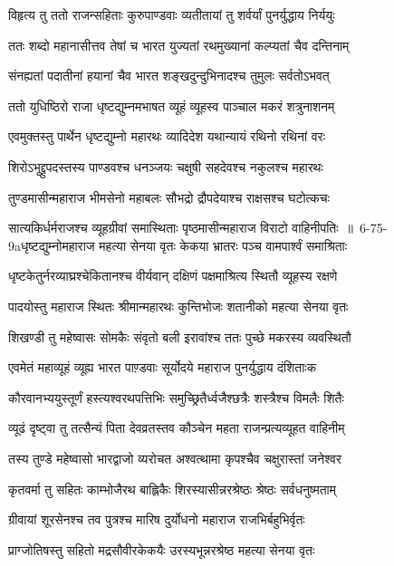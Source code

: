 \twolineshloka
{विहृत्य तु ततो राजन्सहिताः कुरुपाण्डवाः}
{व्यतीतायां तु शर्वर्यां पुनर्युद्धाय निर्ययुः}


\twolineshloka
{ततः शब्दो महानासीत्तव तेषां च भारत}
{युज्यतां रथमुख्यानां कल्प्यतां चैव दन्तिनाम्}


\twolineshloka
{संनह्यतां पदातीनां हयानां चैव भारत}
{शङ्खदुन्दुभिनादश्च तुमुलः सर्वतोऽभवत्}


\twolineshloka
{ततो युधिष्ठिरो राजा धृष्टद्युम्नमभाषत}
{व्यूहं व्यूहस्व पाञ्चाल मकरं शत्रुनाशनम्}


\twolineshloka
{एवमुक्तस्तु पार्थेन धृष्टद्युम्नो महारथः}
{व्यादिदेश यथान्यायं रथिनो रथिनां वरः}


\twolineshloka
{शिरोऽभूद्द्रुपदस्तस्य पाण्डवश्च धनञ्जयः}
{चक्षुषी सहदेवश्च नकुलश्च महारथः}


\twolineshloka
{तुण्डमासीन्महाराज भीमसेनो महाबलः}
{सौभद्रो द्रौपदेयाश्च राक्षसश्च घटोत्कचः}


\threelineshloka
{सात्यकिर्धर्मराजश्च व्यूहग्रीवां समास्थिताः}
{पृष्ठमासीन्महाराज विराटो वाहिनीपतिः ॥ 6-75-9aधृष्टद्युम्नोमहाराज महत्या सेनया वृतः}
{केकया भ्रातरः पञ्च वामपार्श्वं समाश्रिताः}


\twolineshloka
{धृष्टकेतुर्नरव्याघ्रश्चेकितानश्च वीर्यवान्}
{दक्षिणं पक्षमाश्रित्य स्थितौ व्यूहस्य रक्षणे}


\twolineshloka
{पादयोस्तु महाराज स्थितः श्रीमान्महारथः}
{कुन्तिभोजः शतानीको महत्या सेनया वृतः}


\twolineshloka
{शिखण्डी तु महेष्वासः सोमकैः संवृतो बली}
{इरावांश्च ततः पुच्छे मकरस्य व्यवस्थितौ}


\twolineshloka
{एवमेतं महाव्यूहं व्यूह्य भारत पाण़्डवाः}
{सूर्योदये महाराज पुनर्युद्धाय दंशिताःक}


\twolineshloka
{कौरवानभ्ययुस्तूर्णं हस्त्यश्वरथपत्तिभिः}
{समुच्छ्रितैर्ध्वजैश्छत्रैः शस्त्रैश्च विमलैः शितैः}


\twolineshloka
{व्यूढं दृष्ट्वा तु तत्सैन्यं पिता देवव्रतस्तव}
{कौञ्चेन महता राजन्प्रत्यव्यूहत वाहिनीम्}


\twolineshloka
{तस्य तुण्डे महेष्वासो भारद्वाजो व्यरोचत}
{अश्वत्थामा कृपश्चैव चक्षुरास्तां जनेश्वर}


\twolineshloka
{कृतवर्मा तु सहितः काम्भोजैरथ बाह्लिकैः}
{शिरस्यासीन्नरश्रेष्ठः श्रेष्ठः सर्वधनुष्मताम्}


\twolineshloka
{ग्रीवायां शूरसेनश्च तव पुत्रश्च मारिष}
{दुर्योधनो महाराज राजभिर्बहुभिर्वृतः}


\twolineshloka
{प्राग्जोतिषस्तु सहितो मद्रसौवीरकेकयैः}
{उरस्यभून्नरश्रेष्ठ महत्या सेनया वृतः}


